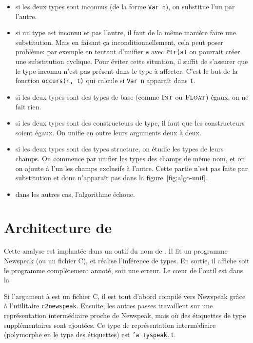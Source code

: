 \begin{itemize}

\item si les deux types sont inconnus (de la forme \texttt{Var n}), on substitue
l'un par l'autre.

\item si un type est inconnu et pas l'autre, il faut de la même manière faire
une substitution.
Mais en faisant ça inconditionnellement, cela peut poser problème:
par exemple en tentant d'unifier \texttt{a} avec \verb!Ptr(a)! on pourrait
créer une substitution cyclique.
Pour éviter cette situation, il suffit de s'assurer que le type inconnu n'est
pas présent dans le type à affecter. C'est le but de la fonction
\texttt{occurs(n, t)} qui calcule si \texttt{Var n} apparaît dans \texttt{t}.

\item si les deux types sont des types de base (comme $\textsc{Int}$ ou $\textsc{Float}$)
égaux, on ne fait rien.

\item si les deux types sont des constructeurs de type, il faut que les
constructeurs soient égaux. On unifie en outre leurs arguments deux à deux.

\item si les deux types sont des types structure, on étudie les types de leurs
champs. On commence par unifier les types des champs de même nom, et on
on ajoute à l'un les champs exclusifs à l'autre. Cette partie n'est pas faite
par substitution et donc n'apparaît pas dans la figure~\ref{fig:algo-unif}.

\item dans les autres cas, l'algorithme échoue.

\end{itemize}

\section{Architecture de \ptrtype}
\label{sec:ptrtype-archi}

Cette analyse est implantée dans un outil du nom de \ptrtype{}. Il lit un
programme Newspeak (ou un fichier C), et réalise l'inférence de types. En
sortie, il affiche soit le programme complètement annoté, soit une erreur. Le
cœur de l'outil est dans la

Si l'argument à \ptrtype{} est un fichier C, il est tout d'abord compilé vers
Newspeak grâce à l'utilitaire \texttt{c2newspeak}. Ensuite, les autres passes
travaillent sur une représentation intermédiaire proche de Newspeak, mais où des
étiquettes de type supplémentaires sont ajoutées. Ce type de représentation
intermédiaire (polymorphe en le type des étiquettes) est \texttt{'a Tyspeak.t}.

